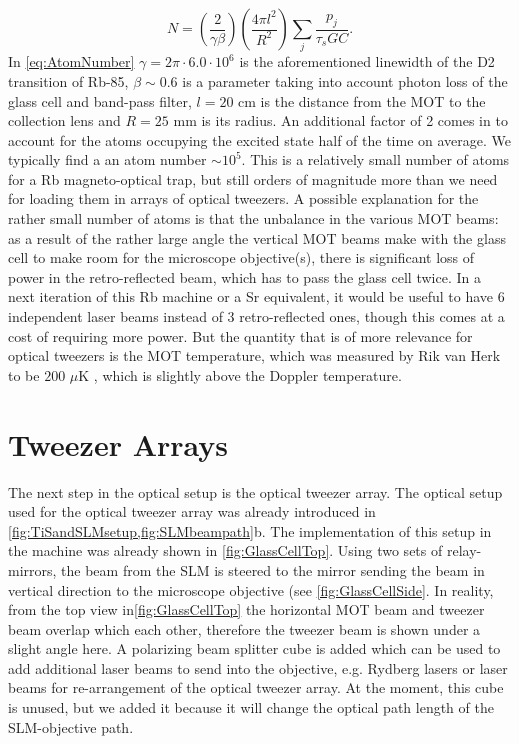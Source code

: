  \begin{equation}\label{eq:AtomNumber}
     N = \left( \frac{2}{\gamma\beta}\right)
     \left(\frac{4\pi l^2}{R^2}\right)
     \sum_j \frac{p_j}{\tau_s G C}.
 \end{equation}
In \cref{eq:AtomNumber} $\gamma = 2\pi \cdot 6.0 \cdot 10^6$ is the aforementioned linewidth of the D2 transition of Rb-85, $\beta \sim 0.6$ is a parameter taking into account photon loss of the glass cell and band-pass filter, $l = 20$ cm is the distance from the MOT to the collection lens and $R = 25$ mm is its radius. 
An additional factor of 2 comes in to account for the atoms occupying the excited state half of the time on average. 
We typically find a an atom number $\sim 10^5$.
This is a relatively small number of atoms for a Rb magneto-optical trap, but still orders of magnitude more than we need for loading them in arrays of optical tweezers. 
A possible explanation for the rather small number of atoms is that the unbalance in the various MOT beams: as a result of the rather large angle the vertical MOT beams make with the glass cell to make room for the microscope objective(s), there is significant loss of power in the retro-reflected beam, which has to pass the glass cell twice. 
In a next iteration of this Rb machine or a Sr equivalent, it would be useful to have 6 independent laser beams instead of 3 retro-reflected ones, though this comes at a cost of requiring more power. 
But the quantity that is of more relevance for optical tweezers is the MOT temperature, which was measured by Rik van Herk to be $200$ $\mu$K \cite{Herk2022}, which is slightly above the Doppler temperature. 
 

\section{Tweezer Arrays}\label{sec:Tweezers}

The next step in the optical setup is the optical tweezer array. 
The optical setup used for the optical tweezer array was already introduced in \cref{fig:TiSandSLMsetup,fig:SLMbeampath}b.
The implementation of this setup in the machine was already shown in \cref{fig:GlassCellTop}.
Using two sets of relay-mirrors, the beam from the \ac{SLM} is steered to the mirror sending the beam in vertical direction to the microscope objective (see \cref{fig:GlassCellSide}. 
In reality, from the top view in\cref{fig:GlassCellTop} the horizontal MOT beam and tweezer beam overlap which each other, therefore the tweezer beam is shown under a slight angle here.
A polarizing beam splitter cube is added which can be used to add additional laser beams to send into the objective, e.g. Rydberg lasers or laser beams for re-arrangement of the optical tweezer array. 
At the moment, this cube is unused, but we added it because it will change the optical path length of the SLM-objective path.

